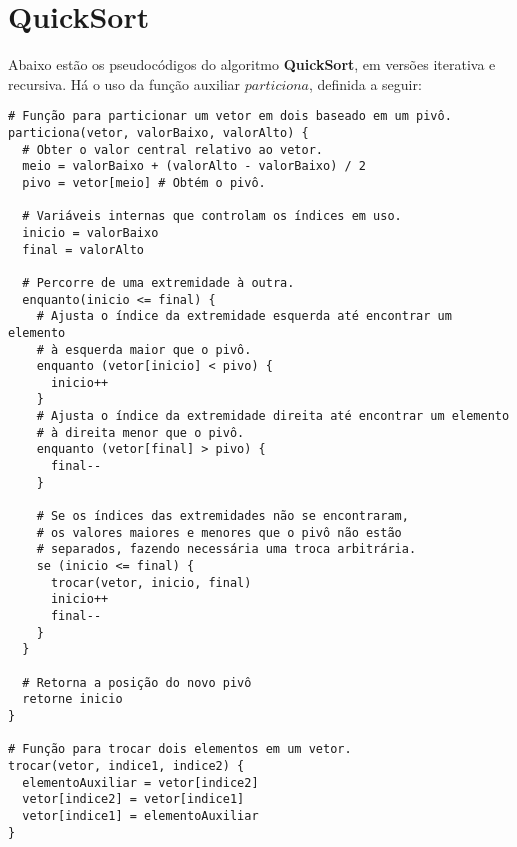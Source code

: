 \section{QuickSort}
Abaixo estão os pseudocódigos do algoritmo \textbf{QuickSort}, em versões iterativa e recursiva. Há o uso da função auxiliar $particiona$, definida a seguir:
\begin{verbatim}
# Função para particionar um vetor em dois baseado em um pivô.
particiona(vetor, valorBaixo, valorAlto) { 
  # Obter o valor central relativo ao vetor.
  meio = valorBaixo + (valorAlto - valorBaixo) / 2
  pivo = vetor[meio] # Obtém o pivô.

  # Variáveis internas que controlam os índices em uso.
  inicio = valorBaixo
  final = valorAlto 
  
  # Percorre de uma extremidade à outra.
  enquanto(inicio <= final) { 
    # Ajusta o índice da extremidade esquerda até encontrar um elemento 
    # à esquerda maior que o pivô.
    enquanto (vetor[inicio] < pivo) { 
      inicio++
    }
    # Ajusta o índice da extremidade direita até encontrar um elemento 
    # à direita menor que o pivô.
    enquanto (vetor[final] > pivo) {
      final--
    }

    # Se os índices das extremidades não se encontraram, 
    # os valores maiores e menores que o pivô não estão
    # separados, fazendo necessária uma troca arbitrária.
    se (inicio <= final) {
      trocar(vetor, inicio, final)
      inicio++
      final--
    }
  }
  
  # Retorna a posição do novo pivô
  retorne inicio
}
   
# Função para trocar dois elementos em um vetor.
trocar(vetor, indice1, indice2) { 
  elementoAuxiliar = vetor[indice2]
  vetor[indice2] = vetor[indice1]
  vetor[indice1] = elementoAuxiliar
}
\end{verbatim}



